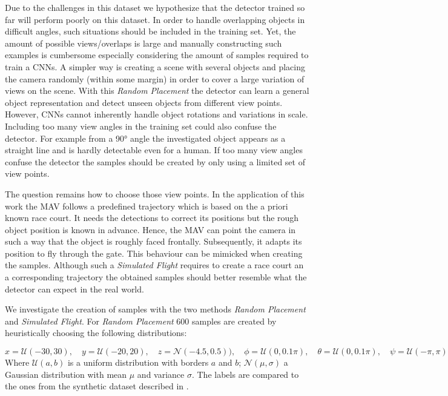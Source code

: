 Due to the challenges in this dataset we hypothesize that the detector trained so far will perform poorly on this dataset. In order to handle overlapping objects in difficult angles, such situations should be included in the training set. Yet, the amount of possible views/overlaps is large and manually constructing such examples is cumbersome especially considering the amount of samples required to train a \acp{CNN}. A simpler way is creating a scene with several objects and placing the camera randomly (within some margin) in order to cover a large variation of views on the scene. With this \textit{Random Placement} the detector can learn a general object representation and detect unseen objects from different view points. However, \acp{CNN} cannot inherently handle object rotations and variations in scale. Including too many view angles in the training set could also confuse the detector. For example from a 90° angle the investigated object appears as a straight line and is hardly detectable even for a human. If too many view angles confuse the detector the samples should be created by only using a limited set of view points.

The question remains how to choose those view points. In the application of this work the \ac{MAV} follows a predefined trajectory which is based on the a priori known race court. It needs the detections to correct its positions but the rough object position is known in advance.
Hence, the \ac{MAV} can point the camera in such a way that the object is roughly faced frontally. Subsequently, it adapts its position to fly through the gate. This behaviour can be mimicked when creating the samples. Although such a \textit{Simulated Flight} requires to create a race court an a corresponding trajectory the obtained samples should better resemble what the detector can expect in the real world.

We investigate the creation of samples with the two methods \textit{Random Placement} and \textit{Simulated Flight}. For \textit{Random Placement} 600 samples are created by heuristically choosing the following distributions:

\begin{equation}
x = \mathcal{U}(-30,30),\quad y = \mathcal{U}(-20,20),\quad z = \mathcal{N}(-4.5,0.5)),\quad
\phi = \mathcal{U}(0,0.1\pi),\quad \theta = \mathcal{U}(0,0.1\pi),\quad \psi = \mathcal{U}(-\pi,\pi)
\label{eq:distroexp}
\end{equation}
Where $\mathcal{U}(a,b)$ is a uniform distribution with borders $a$ and $b$; $\mathcal{N}(\mu,\sigma)$ a Gaussian distribution with mean $\mu$ and variance $\sigma$. The labels are compared to the ones from the synthetic dataset described in .

